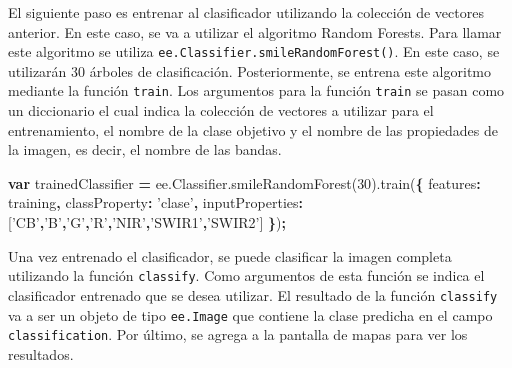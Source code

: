 \documentclass[
]{article}
\newenvironment{Shaded}{\begin{snugshade}}{\end{snugshade}}
\newcommand{\AttributeTok}[1]{\textcolor[rgb]{0.77,0.63,0.00}{#1}}
\newcommand{\DataTypeTok}[1]{\textcolor[rgb]{0.13,0.29,0.53}{#1}}
\newcommand{\DecValTok}[1]{\textcolor[rgb]{0.00,0.00,0.81}{#1}}
\newcommand{\KeywordTok}[1]{\textcolor[rgb]{0.13,0.29,0.53}{\textbf{#1}}}
\newcommand{\NormalTok}[1]{#1}
\newcommand{\OperatorTok}[1]{\textcolor[rgb]{0.81,0.36,0.00}{\textbf{#1}}}
\newcommand{\StringTok}[1]{\textcolor[rgb]{0.31,0.60,0.02}{#1}}
\newcommand{\VariableTok}[1]{\textcolor[rgb]{0.00,0.00,0.00}{#1}}
\begin{document}
El siguiente paso es entrenar al clasificador utilizando la colección de
vectores anterior. En este caso, se va a utilizar el algoritmo Random
Forests. Para llamar este algoritmo se utiliza
\texttt{ee.Classifier.smileRandomForest()}. En este caso, se utilizarán
30 árboles de clasificación. Posteriormente, se entrena este algoritmo
mediante la función \texttt{train}. Los argumentos para la función
\texttt{train} se pasan como un diccionario el cual indica la colección
de vectores a utilizar para el entrenamiento, el nombre de la clase
objetivo y el nombre de las propiedades de la imagen, es decir, el
nombre de las bandas.

\begin{Shaded}
\begin{Highlighting}[]
\KeywordTok{var}\NormalTok{ trainedClassifier }\OperatorTok{=} \VariableTok{ee}\NormalTok{.}\VariableTok{Classifier}\NormalTok{.}\AttributeTok{smileRandomForest}\NormalTok{(}\DecValTok{30}\NormalTok{).}\AttributeTok{train}\NormalTok{(}\OperatorTok{\{}
  \DataTypeTok{features}\OperatorTok{:}\NormalTok{ training}\OperatorTok{,}
  \DataTypeTok{classProperty}\OperatorTok{:} \StringTok{'clase'}\OperatorTok{,}
  \DataTypeTok{inputProperties}\OperatorTok{:}\NormalTok{ [}\StringTok{'CB'}\OperatorTok{,}\StringTok{'B'}\OperatorTok{,}\StringTok{'G'}\OperatorTok{,}\StringTok{'R'}\OperatorTok{,}\StringTok{'NIR'}\OperatorTok{,}\StringTok{'SWIR1'}\OperatorTok{,}\StringTok{'SWIR2'}\NormalTok{]}
\OperatorTok{\}}\NormalTok{)}\OperatorTok{;}
\end{Highlighting}
\end{Shaded}

Una vez entrenado el clasificador, se puede clasificar la imagen
completa utilizando la función \texttt{classify}. Como argumentos de
esta función se indica el clasificador entrenado que se desea utilizar.
El resultado de la función \texttt{classify} va a ser un objeto de tipo
\texttt{ee.Image} que contiene la clase predicha en el campo
\texttt{classification}. Por último, se agrega a la pantalla de mapas
para ver los resultados.

\begin{Shaded}
\end{Shaded}
\end{document}
